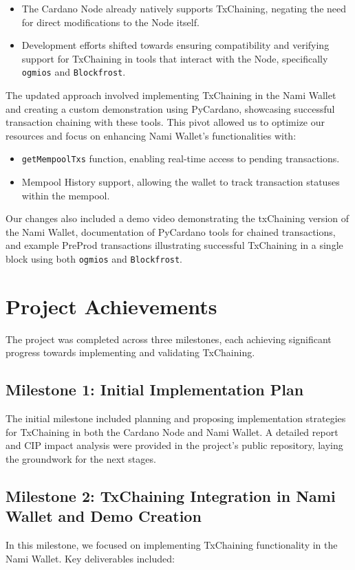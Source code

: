 \documentclass[11pt]{article}
\begin{document}
\begin{itemize}
    \item The Cardano Node already natively supports TxChaining, negating the need for direct modifications to the Node itself.
    \item Development efforts shifted towards ensuring compatibility and verifying support for TxChaining in tools that interact with the Node, specifically \texttt{ogmios} and \texttt{Blockfrost}.
\end{itemize}

The updated approach involved implementing TxChaining in the Nami Wallet and creating a custom demonstration using PyCardano, showcasing successful transaction chaining with these tools. This pivot allowed us to optimize our resources and focus on enhancing Nami Wallet’s functionalities with:

\begin{itemize}
    \item \texttt{getMempoolTxs} function, enabling real-time access to pending transactions.
    \item Mempool History support, allowing the wallet to track transaction statuses within the mempool.
\end{itemize}

Our changes also included a demo video demonstrating the txChaining version of the Nami Wallet, documentation of PyCardano tools for chained transactions, and example PreProd transactions illustrating successful TxChaining in a single block using both \texttt{ogmios} and \texttt{Blockfrost}.

\section{Project Achievements}
The project was completed across three milestones, each achieving significant progress towards implementing and validating TxChaining.

\subsection{Milestone 1: Initial Implementation Plan}
The initial milestone included planning and proposing implementation strategies for TxChaining in both the Cardano Node and Nami Wallet. A detailed report and CIP impact analysis were provided in the project’s public repository, laying the groundwork for the next stages.

\subsection{Milestone 2: TxChaining Integration in Nami Wallet and Demo Creation}
In this milestone, we focused on implementing TxChaining functionality in the Nami Wallet. Key deliverables included:
\end{document}

